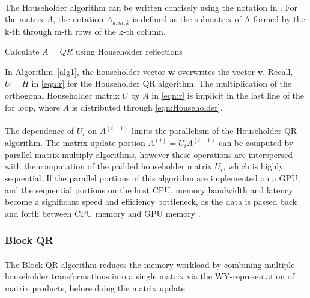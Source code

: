 \documentclass{article}
\begin{document}
\paragraph{}
The Householder algorithm can be written concisely using the notation in \cite{}. For the matrix $A$, the notation $A_{k:m,k}$ is defined as the submatrix of A formed by the k-th through m-th rows of the k-th column. 


\begin{algorithm}
\caption{Calculate $A = QR$ using Householder reflections}
\label{alg1}
\begin{algorithmic}
\ENDFOR
\end{algorithmic}
\end{algorithm}
In Algorithm~\ref{alg1}, the householder vector $\mathbf{w}$ overwrites the vector $\mathbf{v}$. Recall, $U=H$ in \eqref{eqn:r} for the Householder QR algorithm. The multiplication of the orthogonal Householder matrix $U$ by $A$ in \eqref{eqn:r} is implicit in the last line of the for loop, where $A$ is distributed through \eqref{eqn:Householder}.

\paragraph{}
The dependence of $U_i$ on $A^{(i-1)}$ limits the parallelism of the Householder QR algorithm. The matrix update portion $A^{(i)} = U_iA^{(i-1)}$ can be computed by parallel matrix multiply algorithms, however these operations are interspersed with the computation of the padded householder matrix $U_i$, which is highly sequential. If the parallel portions of this algorithm are implemented on a GPU, and the sequential portions on the host CPU, memory bandwidth and latency become a significant speed and efficiency bottleneck, as the data is passed back and forth between CPU memory and GPU memory \cite{doi:10.1137/19M1296367} \cite{BISCHOFC1987TWrf}.

\subsubsection{Block QR}
\paragraph{}
 The Block QR algorithm reduces the memory workload by combining multiple householder transformations into a single matrix via the WY-representation of matrix products, before doing the matrix update \cite{BISCHOFC1987TWrf}.
\end{document}
